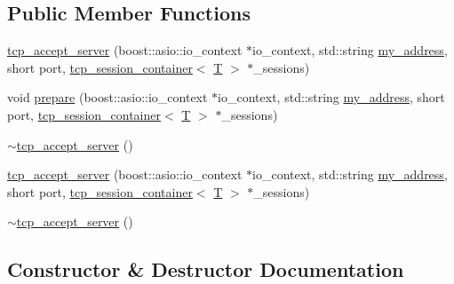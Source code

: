 \subsection*{Public Member Functions}
\begin{DoxyCompactItemize}
\item 
\hyperlink{classgalapagos_1_1net_1_1tcp__accept__server_a44f7191e0eb787b8e5d893ed502415cb}{tcp\+\_\+accept\+\_\+server} (boost\+::asio\+::io\+\_\+context $\ast$io\+\_\+context, std\+::string \hyperlink{test_8cpp_ad6c70ba8571527f1543822ce71b9a109}{my\+\_\+address}, short port, \hyperlink{classgalapagos_1_1net_1_1tcp__session__container}{tcp\+\_\+session\+\_\+container}$<$ \hyperlink{test_8cpp_a0658ceffa730c765d449bb3d21871b5f}{T} $>$ $\ast$\+\_\+sessions)
\item 
void \hyperlink{classgalapagos_1_1net_1_1tcp__accept__server_a7693873e8816380d2157ee1c456988f3}{prepare} (boost\+::asio\+::io\+\_\+context $\ast$io\+\_\+context, std\+::string \hyperlink{test_8cpp_ad6c70ba8571527f1543822ce71b9a109}{my\+\_\+address}, short port, \hyperlink{classgalapagos_1_1net_1_1tcp__session__container}{tcp\+\_\+session\+\_\+container}$<$ \hyperlink{test_8cpp_a0658ceffa730c765d449bb3d21871b5f}{T} $>$ $\ast$\+\_\+sessions)
\item 
\hyperlink{classgalapagos_1_1net_1_1tcp__accept__server_a272d09b62d0cb05324cb2a8f85b8ae64}{$\sim$tcp\+\_\+accept\+\_\+server} ()
\item 
\hyperlink{classgalapagos_1_1net_1_1tcp__accept__server_abf68f05d1d381293ca44f06afa10c0b8}{tcp\+\_\+accept\+\_\+server} (boost\+::asio\+::io\+\_\+context $\ast$io\+\_\+context, std\+::string \hyperlink{test_8cpp_ad6c70ba8571527f1543822ce71b9a109}{my\+\_\+address}, short port, \hyperlink{classgalapagos_1_1net_1_1tcp__session__container}{tcp\+\_\+session\+\_\+container}$<$ \hyperlink{test_8cpp_a0658ceffa730c765d449bb3d21871b5f}{T} $>$ $\ast$\+\_\+sessions)
\item 
\hyperlink{classgalapagos_1_1net_1_1tcp__accept__server_a272d09b62d0cb05324cb2a8f85b8ae64}{$\sim$tcp\+\_\+accept\+\_\+server} ()
\end{DoxyCompactItemize}


\subsection{Constructor \& Destructor Documentation}

